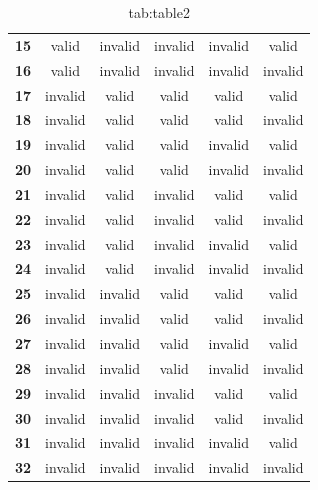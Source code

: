 \begin{table}[H]
\begin{tabular}{cccccc}
        \textbf{15} & valid         & invalid       & invalid                    & invalid                & valid              \\
        \textbf{16} & valid         & invalid       & invalid                    & invalid                & invalid            \\
        \textbf{17} & invalid       & valid         & valid                      & valid                  & valid              \\
        \textbf{18} & invalid       & valid         & valid                      & valid                  & invalid            \\
        \textbf{19} & invalid       & valid         & valid                      & invalid                & valid              \\
        \textbf{20} & invalid       & valid         & valid                      & invalid                & invalid            \\
        \textbf{21} & invalid       & valid         & invalid                    & valid                  & valid              \\
        \textbf{22} & invalid       & valid         & invalid                    & valid                  & invalid            \\
        \textbf{23} & invalid       & valid         & invalid                    & invalid                & valid              \\
        \textbf{24} & invalid       & valid         & invalid                    & invalid                & invalid            \\
        \textbf{25} & invalid       & invalid       & valid                      & valid                  & valid              \\
        \textbf{26} & invalid       & invalid       & valid                      & valid                  & invalid            \\
        \textbf{27} & invalid       & invalid       & valid                      & invalid                & valid              \\
        \textbf{28} & invalid       & invalid       & valid                      & invalid                & invalid            \\
        \textbf{29} & invalid       & invalid       & invalid                    & valid                  & valid              \\
        \textbf{30} & invalid       & invalid       & invalid                    & valid                  & invalid            \\
        \textbf{31} & invalid       & invalid       & invalid                    & invalid                & valid              \\
        \textbf{32} & invalid       & invalid       & invalid                    & invalid                & invalid
    \end{tabular}
    \caption{tab:table2}\label{tab:table2}
\end{table}

